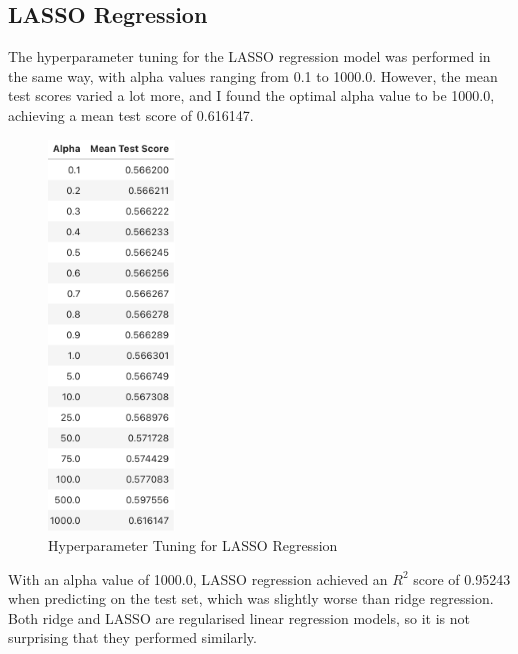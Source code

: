 \documentclass[a4paper, 11pt]{article}
\begin{document}
\subsection{LASSO Regression}
The hyperparameter tuning for the LASSO regression model was performed in the same way, with alpha values ranging from 0.1 to 1000.0. However, the mean test scores varied a lot more, and I found the optimal alpha value to be 1000.0, achieving a mean test score of 0.616147.

\begin{figure}[H]
    \begin{center}
        \includegraphics[width=0.3\textwidth]{Hyperparameter Tuning for LASSO Regression.png}
        \caption{Hyperparameter Tuning for LASSO Regression}
    \end{center}
\end{figure}

With an alpha value of 1000.0, LASSO regression achieved an $R^2$ score of 0.95243 when predicting on the test set, which was slightly worse than ridge regression. Both ridge and LASSO are regularised linear regression models, so it is not surprising that they performed similarly.
\end{document}
